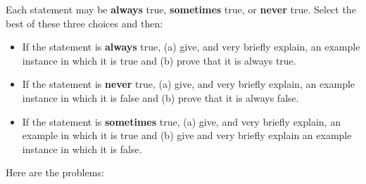 \documentclass[11pt,fleqn]{exam}
\begin{document}
Each statement may be \textbf{always} true, \textbf{sometimes} true, or \textbf{never} true. Select the best of these three choices and then:
	\begin{itemize}
		\item If the statement is \textbf{always} true, (a) give, and very briefly explain, an example instance in which it is true and (b) prove that it is always true.
		\item If the statement is \textbf{never} true, (a) give, and very briefly explain, an example instance in which it is false and (b) prove that it is always false.
		\item If the statement is \textbf{sometimes} true, (a) give, and very briefly explain, an example in which it is true and (b) give and very briefly explain an example instance in which it is false.
	\end{itemize}
	Here are the problems:
\end{document}
